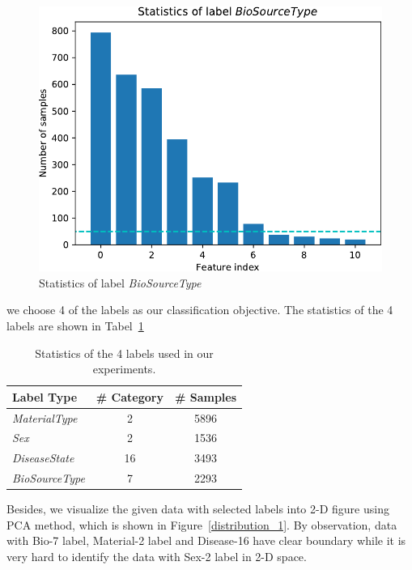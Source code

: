 \documentclass[sigconf]{acmart}
\begin{document}
	\begin{figure}[h]
	\centering
	\includegraphics[width=0.8\linewidth]{../figs/Stat_BioSourceType}
	\caption{Statistics of label \textit{BioSourceType}}
	\label{fig:Stat_BioSourceType}
	\end{figure}
	
	
	we choose 4 of the labels as our classification objective. The statistics of the 4 labels are shown in Tabel~\ref{tab:label}
	\begin{table}[tbp]
		\centering
		\begin{tabular}{l|cc}
			\toprule
			{Label Type} & \# Category & \# Samples \\
			\midrule
			{\textit{MaterialType}}& 2 & 5896 \\
			{\textit{Sex}}		& 2 & 1536     \\
			{\textit{DiseaseState}}& 16 & 3493 \\
			{\textit{BioSourceType}}& 7 & 2293 \\
			\bottomrule	
		\end{tabular}
		\caption{ Statistics of the 4 labels used in our experiments. }
		\label{tab:label}
	\end{table}
	
	
	Besides, we visualize the given data with selected labels into 2-D figure using PCA method, which is shown in Figure~\ref{distribution_1}. By observation, data with Bio-7 label, Material-2 label and Disease-16 have clear boundary while it is very hard to identify the data with Sex-2 label in 2-D space.
\end{document}
